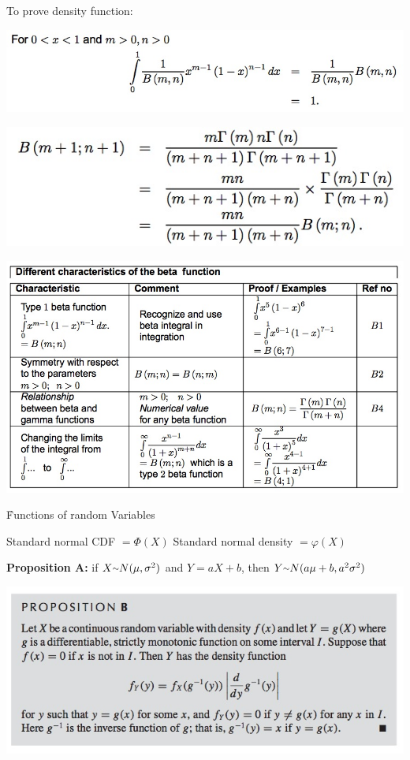 \documentclass{examnotes}
\begin{document}
{To prove density function:

\includegraphics[scale=0.4]{./img/2bet2.jpg}

\includegraphics[scale=0.4]{./img/2bet3.jpg}

\includegraphics[scale=0.5]{./img/2bet1.jpg}

\h{Functions of random Variables}

Standard normal CDF $= \Phi(X)$ \quad Standard normal density $= \varphi(X)$

{\bf Proposition A:}
if $X\mytilde N(\mu,\sigma^2)$ and $Y=aX+b$, then $Y\mytilde N(a\mu+b,a^2\sigma^2)$

\includegraphics[scale=0.6]{./img/2fun1.jpg}

}
\end{document}
